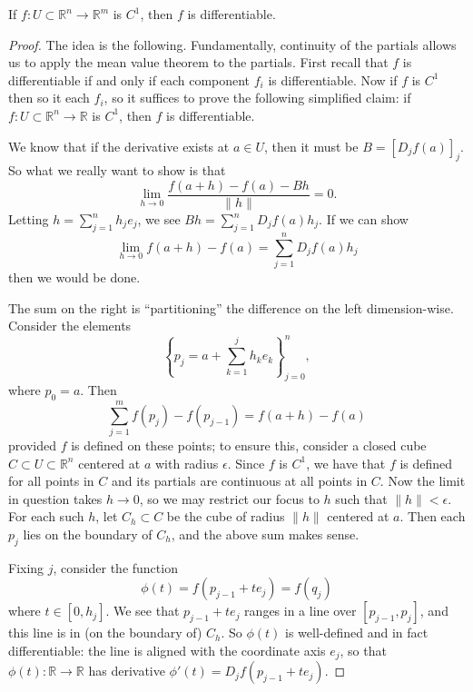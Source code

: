 \documentclass[12pt]{article}
\begin{document}
\begin{theorem}
	If $f:U\subset\mathbb{R}^n\to\mathbb{R}^m$ is $C^1$, then $f$ is differentiable.
\end{theorem}
\begin{proof}
	The idea is the following. Fundamentally, continuity of the partials allows us to apply the mean value theorem to the partials. First recall that $f$ is differentiable if and only if each component $f_i$ is differentiable. Now if $f$ is $C^1$ then so it each $f_i$, so it suffices to prove the following simplified claim: if $f:U\subset\mathbb{R}^n\to\mathbb{R}$ is $C^1$, then $f$ is differentiable. 

	We know that if the derivative exists at $a\in U$, then it must be $B=[D_jf(a)]_{j}$. So what we really want to show is that 
	\begin{equation*}
		\lim_{h\to 0}\frac{f(a+h)-f(a) - Bh}{\|h\|} = 0.
	\end{equation*}
	Letting $h=\sum_{j=1}^n h_je_j$, we see $Bh=\sum_{j=1}^n D_jf(a)h_j$. If we can show 
	\begin{equation*}
		\lim_{h\to 0}f(a+h) - f(a) = \sum_{j=1}^n D_jf(a)h_j
	\end{equation*}
	then we would be done.

	The sum on the right is ``partitioning'' the difference on the left dimension-wise. Consider the elements
	\begin{equation*}
		\left\{p_j = a + \sum_{k=1}^j h_ke_k \right\}_{j=0}^n,
	\end{equation*}
	where $p_0=a$. Then 
	\begin{equation*}
		\sum_{j=1}^m f(p_j) - f(p_{j-1}) = f(a+h) - f(a)
	\end{equation*}
	provided $f$ is defined on these points; to ensure this, consider a closed cube $C\subset U\subset \mathbb{R}^n$ centered at $a$ with radius $\epsilon$. Since $f$ is $C^1$, we have that $f$ is defined for all points in $C$ and its partials are continuous at all points in $C$. Now the limit in question takes $h\to 0$, so we may restrict our focus to $h$ such that $\|h\|<\epsilon$. For each such $h$, let $C_h\subset C$ be the cube of radius $\|h\|$ centered at $a$. Then each $p_j$ lies on the boundary of $C_h$, and the above sum makes sense. 

	Fixing $j$, consider the function 
	\begin{equation*}
		\phi(t) = f(p_{j-1}+te_j) = f(q_j)
	\end{equation*}
	where $t\in [0, h_j]$. We see that $p_{j-1}+te_j$ ranges in a line over $[p_{j-1}, p_j]$, and this line is in (on the boundary of) $C_h$. So $\phi(t)$ is well-defined and in fact differentiable: the line is aligned with the coordinate axis $e_j$, so that $\phi(t):\mathbb{R} \to \mathbb{R}$ has derivative $\phi'(t)=D_jf(p_{j-1}+te_j)$. 


\end{proof}
\end{document}
